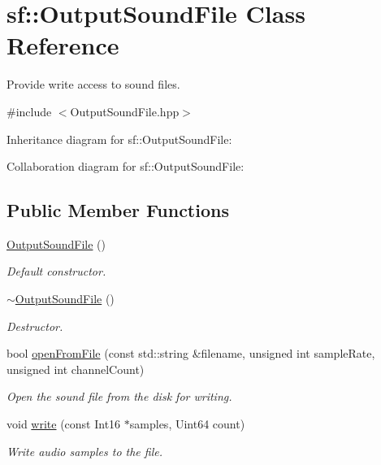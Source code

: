 \hypertarget{classsf_1_1_output_sound_file}{}\section{sf\+:\+:Output\+Sound\+File Class Reference}
\label{classsf_1_1_output_sound_file}


Provide write access to sound files.  




{\ttfamily \#include $<$Output\+Sound\+File.\+hpp$>$}



Inheritance diagram for sf\+:\+:Output\+Sound\+File\+:


Collaboration diagram for sf\+:\+:Output\+Sound\+File\+:
\subsection*{Public Member Functions}
\begin{DoxyCompactItemize}
\item 
\mbox{\label{classsf_1_1_output_sound_file_a7ae9f2dbd0991fa9394726a3d58bb19e}} 
\hyperlink{classsf_1_1_output_sound_file_a7ae9f2dbd0991fa9394726a3d58bb19e}{Output\+Sound\+File} ()
\begin{DoxyCompactList}\small\item\em Default constructor. \end{DoxyCompactList}\item 
\hyperlink{classsf_1_1_output_sound_file_a1492adbfef1f391d720afb56f068182e}{$\sim$\+Output\+Sound\+File} ()
\begin{DoxyCompactList}\small\item\em Destructor. \end{DoxyCompactList}\item 
bool \hyperlink{classsf_1_1_output_sound_file_ae5e55f01c53c1422c44eaed2eed67fce}{open\+From\+File} (const std\+::string \&filename, unsigned int sample\+Rate, unsigned int channel\+Count)
\begin{DoxyCompactList}\small\item\em Open the sound file from the disk for writing. \end{DoxyCompactList}\item 
void \hyperlink{classsf_1_1_output_sound_file_adfcf525fced71121f336fa89faac3d67}{write} (const Int16 $\ast$samples, Uint64 count)
\begin{DoxyCompactList}\small\item\em Write audio samples to the file. \end{DoxyCompactList}\end{DoxyCompactItemize}


